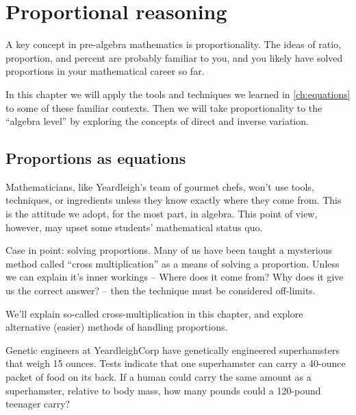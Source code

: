 \chapter{Proportional reasoning}
\label{ch:proportions}


A key concept in pre-algebra mathematics is proportionality. The ideas of ratio, proportion, and percent are probably familiar to you, and you likely have solved proportions in your mathematical career so far.

In this chapter we will apply the tools and techniques we learned in \cref{ch:equations} to some of these familiar contexts. Then we will take proportionality to the ``algebra level'' by exploring the concepts of direct and inverse variation.

\section{Proportions as equations}
\label{sec:propsaseqs}

Mathematicians, like Yeardleigh's team of gourmet chefs, won't use tools, techniques, or ingredients unless they know exactly where they come from. This is the attitude we adopt, for the most part, in algebra. This point of view, however, may upset some students' mathematical status quo.

Case in point: solving proportions. Many of us have been taught a mysterious method called ``cross multiplication'' as a means of solving a proportion. Unless we can explain it's inner workings -- Where does it come from? Why does it give us the correct answer? -- then the technique must be considered off-limits.

We'll explain so-called cross-multiplication in this chapter, and explore alternative (easier) methods of handling proportions.


\begin{boxexplore}
Genetic engineers at YeardleighCorp have genetically engineered superhamsters that weigh 15 ounces. Tests indicate that one superhamster can carry a 40-ounce packet of food on its back. If a human could carry the same amount as a superhamster, relative to body mass, how many pounds could a 120-pound teenager carry?
\end{boxexplore}

